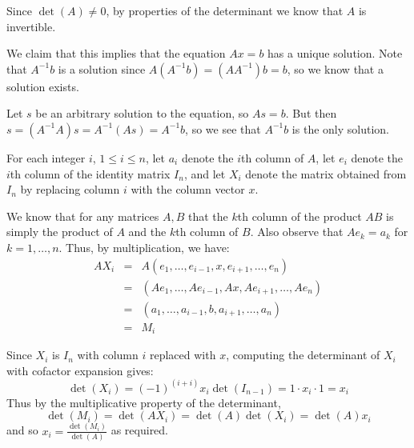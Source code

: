 \documentclass[12pt]{article}
\begin{document}
Since $\det(A) \neq 0$, by properties of the determinant we know that $A$ is invertible.

We claim that this implies that the equation $Ax=b$ has a unique solution.
Note that $A^{-1}b$ is a solution since $A(A^{-1}b)=(AA^{-1})b=b$, so we know that a solution exists.

Let $s$ be an arbitrary solution to the equation, so $As=b$.  But then $s=(A^{-1}A)s=A^{-1}(As)=A^{-1}b$, so we see that $A^{-1}b$ is the only solution.

For each integer $i$, $1 \leq i \leq n$, let $a_i$ denote the $i$th column of $A$, let $e_i$ denote the $i$th column of the identity matrix $I_n$, and let $X_i$ denote the matrix obtained from $I_n$ by replacing column $i$ with the column vector $x$.

We know that for any matrices $A,B$ that the $k$th column of the product $AB$ is simply the product of $A$ and the $k$th column of $B$.  Also observe that $Ae_k=a_k$ for $k=1,\ldots,n$.  Thus, by multiplication, we have:
\[ \begin{array}{lll}
   AX_i & = & A (e_1,\ldots,e_{i-1},x,e_{i+1},\ldots,e_n) \\
        & = & (Ae_1,\ldots,Ae_{i-1},Ax,Ae_{i+1},\ldots,Ae_n) \\
        & = & (a_1,\ldots,a_{i-1},b,a_{i+1},\ldots,a_n) \\
        & = & M_i 
\end{array} \]

Since $X_i$ is $I_n$ with column $i$ replaced with $x$, computing the determinant of $X_i$ with cofactor expansion gives:
\[ \det(X_i) = (-1)^{(i+i)} x_i \det(I_{n-1}) = 1 \cdot x_i \cdot 1 = x_i\]
Thus by the multiplicative property of the determinant,
\[ \det(M_i) = \det(AX_i) = \det(A) \det(X_i) = \det(A) x_i \]
and so $x_i = \frac{\det(M_i)}{\det(A)}$ as required.
\end{document}
